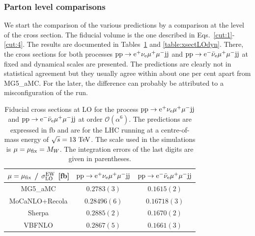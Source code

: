\documentclass[11pt]{cernrep}
\begin{document}
\subsubsection*{Parton level comparisons}

We start the comparison of the various predictions by a comparison at the level of the cross section.
The fiducial volume is the one described in Eqs.~\eqref{cut:1}-\eqref{cut:4}.
The results are documented in Tables~\ref{table:xsectLOfix} and \ref{table:xsectLOdyn}.
There, the cross sections for both processes ${\rm p} {\rm p} \to {\rm e}^+  \nu_{\rm e}  \mu^+ \mu^- {\rm j} {\rm j}$ and ${\rm p} {\rm p} \to {\rm e}^-  \bar \nu_{\rm e}  \mu^+ \mu^- {\rm j} {\rm j}$ at fixed and dynamical scales are presented.
The predictions are clearly not in statistical agreement but they usually agree within about one per cent apart from {\sc MG5\_aMC}.
For the later, the difference can probably be attributed to a misconfiguration of the run.

\begin{table}
\begin{center} 
\begin{tabular}{ c | c | c }
 $\mu = \mu_{\rm fix}$ / $\sigma_{\rm LO}^{\rm EW}$ [fb] & ${\rm p} {\rm p} \to {\rm e}^+  \nu_{\rm e}  \mu^+ \mu^- {\rm j} {\rm j}$  & ${\rm p} {\rm p} \to {\rm e}^-  \bar \nu_{\rm e}  \mu^+ \mu^- {\rm j} {\rm j}$  \\
  \hline\hline
  {\sc MG5\_aMC}                  & $0.2783(3)$     & $0.1615(2)$   \\
  {\sc MoCaNLO}+{\sc Recola}      & $0.28496(6)$    & $0.16718(3)$  \\
  {\sc Sherpa}                    & $0.2885(2)$     & $0.1670(2)$   \\
  {\sc VBFNLO}                    & $0.2867(5)$     & $0.1661(3)$   \\
  \hline
\end{tabular}
\end{center}
\caption{
Fiducial cross sections at LO for the process ${\rm p}{\rm p}\to{\rm e}^+\nu_{\rm e}\mu^+\mu^-{\rm j}{\rm j}$ and ${\rm p}{\rm p}\to{\rm e}^-\bar\nu_{\rm e}\mu^+\mu^-{\rm j}{\rm j}$ at order $\mathcal{O} (\alpha^6)$.
The predictions are expressed in fb and are for the LHC running at a centre-of-mass energy of $\sqrt{s}=13 {\rm~TeV}$.
The scale used in the simulations is $\mu = \mu_{\rm fix} = M_W$.
The integration errors of the last digits are given in parentheses.}
\label{table:xsectLOfix}
\end{table}
\end{document}
